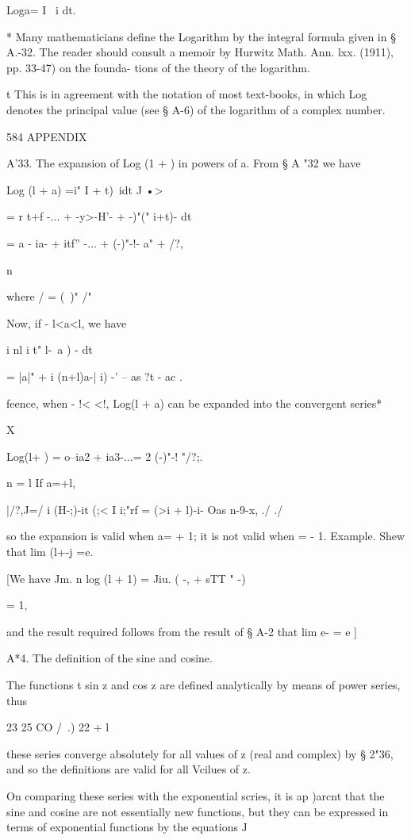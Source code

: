 Loga= I ~i dt.

* Many mathematicians define the Logarithm by the integral formula
given in § A.-32. The reader should consult a memoir by Hurwitz Math.
Ann. lxx. (1911), pp. 33-47) on the founda- tions of the theory of the
logarithm.

t This is in agreement with the notation of most text-books, in which
Log denotes the principal value (see § A-6) of the logarithm of a
complex number.



584 APPENDIX

A'33. The expansion of Log (1 + ) in powers of a. From § A "32 we have

Log (l + a) =i" I + t)~idt J •>

= r t+f -... + -y>-H'- + -)"(" i+t)- dt

= a - ia- + itf'' -... + (-)"-!- a" + /?,

n

where / = (\ )" /"%

Now, if - l<a<l, we have

i nl i t" l-\ a ) - dt

= |a|" + i (n+l)a-| i) -' -- as ?t - ac .

feence, when - !< <!, Log(l + a) can be expanded into the convergent
series*

X

Log(l+ ) = o--ia2 + ia3-...= 2 (-)"-! "/?;.

n = l If a=+l,

|/?,J=/ i (H-;)-it (;< I i;"rf = (>i + l)-i- Oas n-9-x, ./ ./

so the expansion is valid when a= + 1; it is not valid when = - 1.
Example. Shew that lim (l+-j =e.

[We have Jm. n log (l + 1) = Jiu. ( -, + sTT " -)

= 1,

and the result required follows from the result of § A-2 that lim e- =
e ]

A*4. The definition of the sine and cosine.

The functions t sin z and cos z are defined analytically by means of
power series, thus

23 25 CO /\ .) 22 + l

these series converge absolutely for all values of z (real and
complex) by § 2"36, and so the definitions are valid for all Vcilues
of z.

On comparing these series with the exponential scries, it is ap )arcnt
that the sine and cosine are not essentially new functions, but they
can be expressed in terms of exponential functions by the equations J

